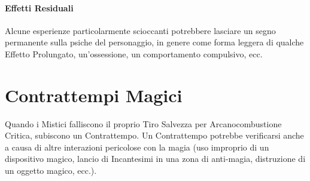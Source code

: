 \documentclass[itdr]{subfiles}
\begin{document}
\paragraph{Effetti Residuali}
Alcune esperienze particolarmente scioccanti potrebbere lasciare un segno permanente sulla psiche del personaggio, in genere come forma leggera di qualche Effetto Prolungato, un'ossessione, un comportamento compulsivo, ecc.

\vfill
\break

\section{Contrattempi Magici}
\label{sec:contrattempi_magici}

Quando i Mistici falliscono il proprio Tiro Salvezza per Arcanocombustione Critica, subiscono un Contrattempo. Un Contrattempo potrebbe verificarsi anche a causa di altre \mbox{interazioni} pericolose con la magia (uso improprio di un dispositivo magico, lancio di Incantesimi in una zona di anti-magia, distruzione di un oggetto magico, ecc.).
\end{document}
